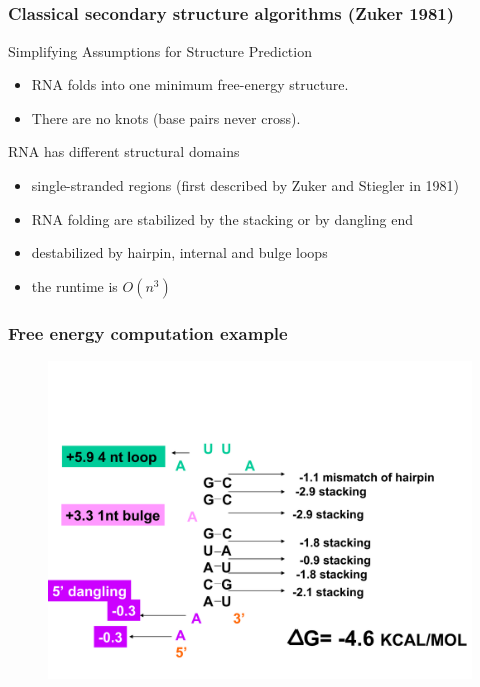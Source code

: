 \documentclass[ignorenonframetext,10pt]{beamer}
\begin{document}
\subsection{}
\begin{frame}
\frametitle{\large Classical secondary structure algorithms (Zuker 1981)}
  \begin{block}{Simplifying Assumptions for Structure Prediction}
    \begin{itemize}
    \item RNA folds into one minimum free-energy structure.
    \item There are no knots (base pairs never cross).
    \end{itemize} 
  \end{block}
  \begin{block}{RNA has different structural domains}
    \begin{itemize}
    \item single-stranded regions (first described by Zuker and Stiegler in
    1981)
    \item RNA folding are stabilized by the stacking or by dangling end
    \item destabilized by hairpin, internal and bulge loops
    \item the runtime is $O(n^3)$
    \end{itemize}
  \end{block}
\end{frame}


\begin{frame}
\frametitle{Free energy computation example}  
\begin{figure}
  \includegraphics[scale=0.4]{images/mfe_example.pdf} 
\end{figure}
\end{frame}
\end{document}
